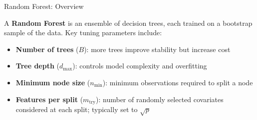 \begin{frame}{Random Forest: Overview}

A \textbf{Random Forest} is an ensemble of decision trees, each trained on a
bootstrap sample of the data. Key tuning parameters include:

\vspace{0.5em}

\begin{itemize}
    \item \textbf{Number of trees} ($B$): more trees improve stability but increase cost
    \item \textbf{Tree depth} ($d_{\max}$): controls model complexity and overfitting
    \item \textbf{Minimum node size} ($n_{\min}$): minimum observations required to split a node
    \item \textbf{Features per split} ($m_{\text{try}}$): number of randomly selected covariates
    considered at each split; typically set to $\sqrt{p}$
\end{itemize}

\end{frame}
